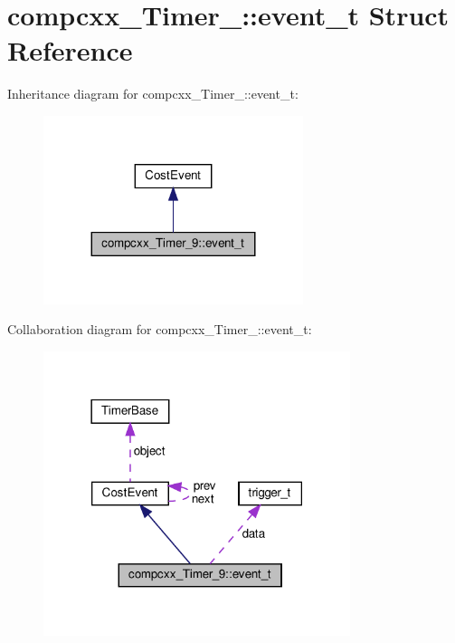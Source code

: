 \hypertarget{structcompcxx__Timer__9_1_1event__t}{}\section{compcxx\+\_\+\+Timer\+\_\+:\+:event\+\_\+t Struct Reference}
\label{structcompcxx__Timer__9_1_1event__t}


Inheritance diagram for compcxx\+\_\+\+Timer\+\_\+:\+:event\+\_\+t\+:\nopagebreak
\begin{figure}[H]
\begin{center}
\leavevmode
\includegraphics[width=215pt]{structcompcxx__Timer__9_1_1event__t__inherit__graph}
\end{center}
\end{figure}


Collaboration diagram for compcxx\+\_\+\+Timer\+\_\+:\+:event\+\_\+t\+:\nopagebreak
\begin{figure}[H]
\begin{center}
\leavevmode
\includegraphics[width=254pt]{structcompcxx__Timer__9_1_1event__t__coll__graph}
\end{center}
\end{figure}
